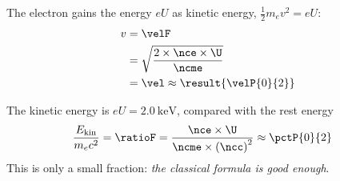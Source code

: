 \begin{abcliste}
\abc The electron gains the energy $e U$ as kinetic energy, $\frac{1}{2} m_e v^2 = e U$:
\begin{align}
 v &= \velF \\
   &= \sqrt{\frac{2\times\nce\times\U}{\ncme}} \\
   &= \vel \approx \result{\velP{0}{2}}
\end{align}

\abc The kinetic energy is $e U = \SI{2.0}{\kilo\electronvolt}$, compared with the rest energy
\begin{align}
 \frac{E_\mathrm{kin}}{m_e c^2} &= \ratioF = \frac{\nce\times\U}{\ncme\times\left(\ncc\right)^2} \approx \pctP{0}{2}
\end{align}
This is only a small fraction: \emph{the classical formula is good enough}.
\end{abcliste}
